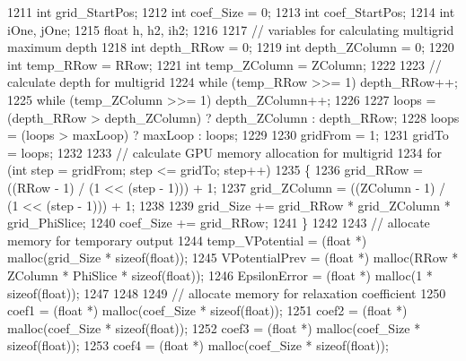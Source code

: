 \begin{DoxyCode}
1211     \textcolor{keywordtype}{int} grid\_StartPos;
1212     \textcolor{keywordtype}{int} coef\_Size = 0;
1213     \textcolor{keywordtype}{int} coef\_StartPos;
1214     \textcolor{keywordtype}{int} iOne, jOne;
1215     \textcolor{keywordtype}{float} h, h2, ih2;
1216 
1217     \textcolor{comment}{// variables for calculating multigrid maximum depth}
1218     \textcolor{keywordtype}{int} depth\_RRow = 0;
1219     \textcolor{keywordtype}{int} depth\_ZColumn = 0;
1220     \textcolor{keywordtype}{int} temp\_RRow = RRow;
1221     \textcolor{keywordtype}{int} temp\_ZColumn = ZColumn;
1222 
1223     \textcolor{comment}{// calculate depth for multigrid}
1224     \textcolor{keywordflow}{while} (temp\_RRow >>= 1) depth\_RRow++;  
1225     \textcolor{keywordflow}{while} (temp\_ZColumn >>= 1) depth\_ZColumn++;
1226   
1227     loops = (depth\_RRow > depth\_ZColumn) ? depth\_ZColumn : depth\_RRow;
1228     loops = (loops > maxLoop) ? maxLoop : loops;
1229 
1230     gridFrom = 1;
1231     gridTo = loops;
1232 
1233     \textcolor{comment}{// calculate GPU memory allocation for multigrid}
1234     \textcolor{keywordflow}{for} (\textcolor{keywordtype}{int} step = gridFrom; step <= gridTo; step++)
1235     \{
1236         grid\_RRow = ((RRow - 1) / (1 << (step - 1))) + 1;
1237         grid\_ZColumn = ((ZColumn - 1) / (1 << (step - 1))) + 1;
1238         
1239         grid\_Size += grid\_RRow * grid\_ZColumn * grid\_PhiSlice;
1240         coef\_Size += grid\_RRow;
1241     \}
1242 
1243     \textcolor{comment}{// allocate memory for temporary output}
1244     temp\_VPotential         = (\textcolor{keywordtype}{float} *) malloc(grid\_Size * \textcolor{keyword}{sizeof}(\textcolor{keywordtype}{float}));
1245     VPotentialPrev = (\textcolor{keywordtype}{float} *) malloc(RRow * ZColumn * PhiSlice * \textcolor{keyword}{sizeof}(\textcolor{keywordtype}{float}));
1246     EpsilonError = (\textcolor{keywordtype}{float} *) malloc(1 * \textcolor{keyword}{sizeof}(\textcolor{keywordtype}{float}));
1247 
1248 
1249     \textcolor{comment}{// allocate memory for relaxation coefficient}
1250     coef1 = (\textcolor{keywordtype}{float} *) malloc(coef\_Size * \textcolor{keyword}{sizeof}(\textcolor{keywordtype}{float}));
1251     coef2 = (\textcolor{keywordtype}{float} *) malloc(coef\_Size * \textcolor{keyword}{sizeof}(\textcolor{keywordtype}{float}));
1252     coef3 = (\textcolor{keywordtype}{float} *) malloc(coef\_Size * \textcolor{keyword}{sizeof}(\textcolor{keywordtype}{float}));
1253     coef4 = (\textcolor{keywordtype}{float} *) malloc(coef\_Size * \textcolor{keyword}{sizeof}(\textcolor{keywordtype}{float}));

\end{DoxyCode}
